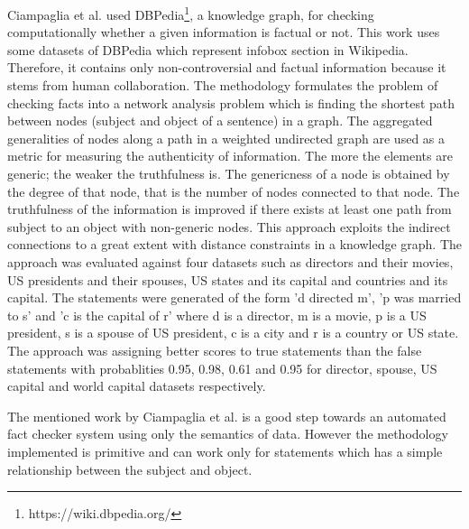 \documentclass[a4paper, 11pt]{article}
\begin{document}
Ciampaglia et al. \cite{Ciampaglia2015} used DBPedia\footnote{https://wiki.dbpedia.org/}, a knowledge graph, for checking computationally whether a given information is factual or not. This work uses some datasets of DBPedia which represent infobox section in Wikipedia. Therefore, it contains only non-controversial and factual information because it stems from human collaboration. The methodology formulates the problem of checking facts into a network analysis problem which is finding the shortest path between nodes (subject and object of a sentence) in a graph. The aggregated generalities of nodes along a path in a weighted undirected graph are used as a metric for measuring the authenticity of information. The more the elements are generic; the weaker the truthfulness is.  The genericness of a node is obtained by the degree of that node, that is the number of nodes connected to that node. The truthfulness of the information is improved if there exists at least one path from subject to an object with non-generic nodes. This approach exploits the indirect connections to a great extent with distance constraints in a knowledge graph. The approach was evaluated against four datasets such as directors and their movies, US presidents and their spouses, US states and its capital and countries and its capital. The statements were generated of the form 'd directed m', 'p was married to s' and 'c is the capital of r' where d is a director, m is a movie, p is a US president, s is a spouse of US president, c is a city and r is a country or US state. The approach was assigning better scores to true statements than the false statements with probablities 0.95, 0.98, 0.61 and 0.95 for director, spouse, US capital and world capital datasets respectively.

The mentioned work by Ciampaglia et al. is a good step towards an automated fact checker system using only the semantics of data. However the methodology implemented is primitive and can work only for statements which has a simple relationship between the subject and object.





\end{document}
